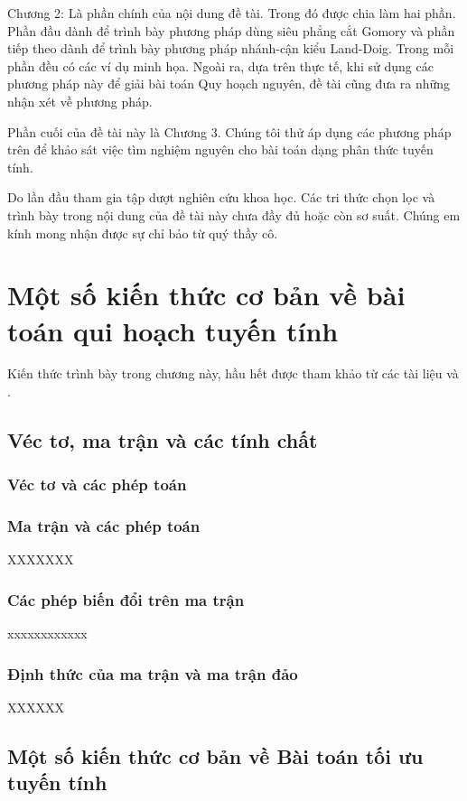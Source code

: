 \documentclass[12pt,a4paper]{report}
\begin{document}
Chương 2: Là phần chính của nội dung đề tài. Trong đó được chia làm hai phần. Phần đầu dành để trình bày phương pháp dùng siêu phẳng cắt Gomory và phần tiếp theo dành để trình bày phương pháp nhánh-cận kiểu Land-Doig. Trong mỗi phần đều có các ví dụ minh họa. Ngoài ra, dựa trên thực tế, khi sử dụng các phương pháp này để giải bài toán Quy hoạch nguyên, đề tài cũng đưa ra những nhận xét về phương pháp.

Phần cuối của đề tài này là Chương 3. Chúng tôi thử áp dụng các phương pháp trên để khảo sát việc tìm nghiệm nguyên cho bài toán dạng phân thức tuyến tính. 

Do lần đầu tham gia tập dượt nghiên cứu khoa học. Các tri thức chọn lọc và trình bày trong nội dung của đề tài này chưa đầy đủ hoặc còn sơ suất. Chúng em kính mong nhận được sự chỉ bảo từ quý thầy cô.

\newpage
\renewcommand{\baselinestretch}{1.2}
 
\chapter{Một số kiến thức cơ bản về bài toán qui hoạch tuyến tính} 
Kiến thức trình bày trong chương này, hầu hết được tham khảo từ các tài liệu  \cite{xxx} và \cite{xxx}.
\section{ Véc tơ, ma trận và các tính chất}

\subsection{ Véc tơ và các phép toán }

\subsection{ Ma trận và các phép toán}

XXXXXXX

\subsection{Các phép biến đổi trên ma trận}
xxxxxxxxxxxx

\subsection{ Định thức của ma trận và ma trận đảo}
XXXXXX


\section{Một số kiến thức cơ bản về Bài toán tối ưu tuyến tính}
\end{document}
